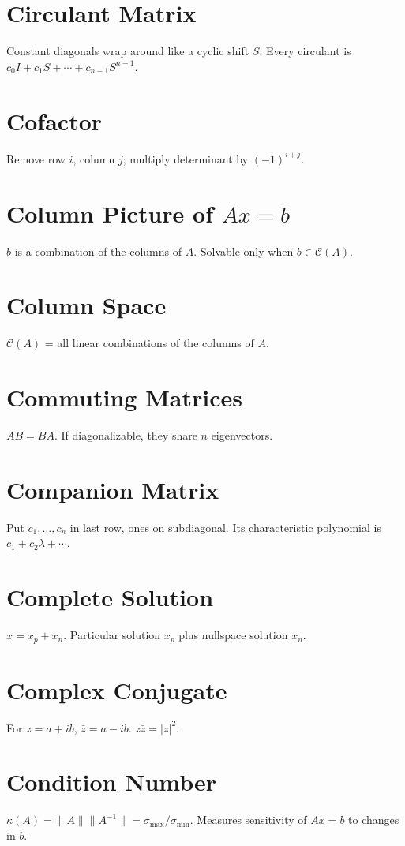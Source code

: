 \documentclass[12pt]{book}
\begin{document}
\chapter{Circulant Matrix}
Constant diagonals wrap around like a cyclic shift $S$. Every circulant is $c_0 I + c_1 S + \cdots + c_{n-1} S^{n-1}$.

\chapter{Cofactor}
Remove row $i$, column $j$; multiply determinant by $(-1)^{i+j}$.

\chapter{Column Picture of $Ax = b$}
$b$ is a combination of the columns of $A$. Solvable only when $b \in \mathcal{C}(A)$.

\chapter{Column Space}
$\mathcal{C}(A)$ = all linear combinations of the columns of $A$.

\chapter{Commuting Matrices}
$AB = BA$. If diagonalizable, they share $n$ eigenvectors.

\chapter{Companion Matrix}
Put $c_1,\dots,c_n$ in last row, ones on subdiagonal. Its characteristic polynomial is $c_1 + c_2 \lambda + \cdots$.

\chapter{Complete Solution}
$x = x_p + x_n$. Particular solution $x_p$ plus nullspace solution $x_n$.

\chapter{Complex Conjugate}
For $z=a+ib$, $\bar z = a - ib$. $z \bar z = |z|^2$.

\chapter{Condition Number}
$\kappa(A) = \|A\|\|A^{-1}\| = \sigma_{\max}/\sigma_{\min}$. Measures sensitivity of $Ax=b$ to changes in $b$.
\end{document}
